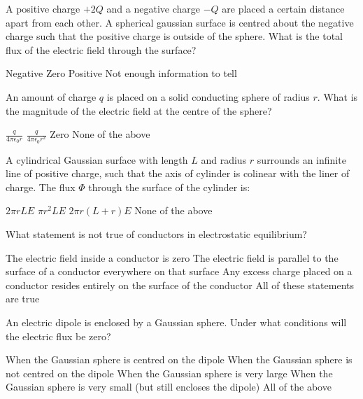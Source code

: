 \question A positive charge $+2Q$ and a negative charge $-Q$ are placed a certain distance apart from each other. A spherical gaussian surface is centred about the negative charge such that the positive charge is outside of the sphere. What is the total flux of the electric field through the surface?
\begin{checkboxes}
	\CorrectChoice Negative
	\choice Zero
	\choice Positive
	\choice Not enough information to tell
\end{checkboxes}


\question An amount of charge $q$ is placed on a solid conducting sphere of radius $r$. What is the magnitude of the electric field at the centre of the sphere?
\begin{checkboxes}
\choice $\frac{q}{4\pi\epsilon_0 r}$
\choice $\frac{q}{4\pi\epsilon_0 r^2}$
\CorrectChoice Zero \correct
\choice None of the above
\end{checkboxes}

\question A cylindrical Gaussian surface with length $L$ and radius $r$ surrounds an infinite line of positive charge, such that the axis of cylinder is colinear with the liner of charge. The flux $\Phi$ through the surface of the cylinder is:
\begin{checkboxes}
\CorrectChoice $2\pi rLE$ \correct
\choice $\pi r^2LE$
\choice $2\pi r(L+r)E$
\choice None of the above
\end{checkboxes}

\question What statement is not true of conductors in electrostatic equilibrium?
\begin{checkboxes}
\choice The electric field inside a conductor is zero
\CorrectChoice The electric field is parallel to the surface of a conductor everywhere on that surface \correct
\choice Any excess charge placed on a conductor resides entirely on the surface of the conductor
\choice All of these statements are true
\end{checkboxes}

\question An electric dipole is enclosed by a Gaussian sphere. Under what conditions will the electric flux be zero? 
\begin{checkboxes}
\choice When the Gaussian sphere is centred on the dipole
\choice When the Gaussian sphere is not centred on the dipole
\choice When the Gaussian sphere is very large
\choice When the Gaussian sphere is very small (but still encloses the dipole)
\CorrectChoice All of the above \correct
\end{checkboxes}


